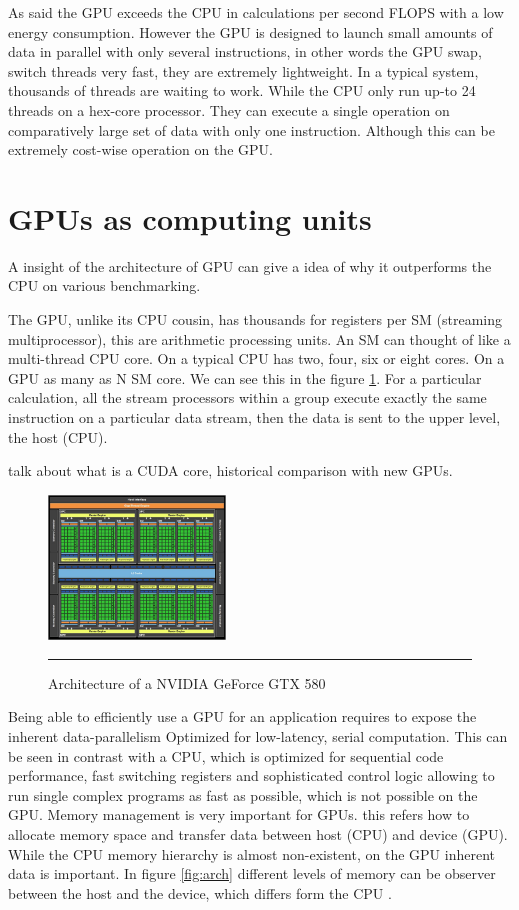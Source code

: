 As said the GPU exceeds the CPU in calculations per second FLOPS with a low energy consumption. However the GPU is designed to launch small amounts of data in parallel with only several instructions, in other words the GPU swap, switch threads very fast, they are extremely lightweight. In a typical system, thousands of threads are waiting to work. While the CPU only run up-to 24 threads on a hex-core processor. They can execute a single operation on comparatively large set of data with only one instruction. Although this can be extremely cost-wise operation on the GPU.

\section{GPUs as computing units}

A insight of the architecture of GPU can give a idea of  why it outperforms the CPU on various benchmarking.

The GPU, unlike its CPU cousin, has thousands for registers per SM (streaming multiprocessor), this are  arithmetic processing units. An SM can thought of like a multi-thread CPU core. On a typical CPU has two, four, six or eight cores. On a GPU as many as N SM core. We can see this in the figure \ref{fig:gpu_cpu}. For a particular calculation, all the stream
processors within a group execute exactly the same instruction on a particular data stream, then the data is sent to the upper level, the host (CPU). \cite{cook}

talk about what is a CUDA core, historical comparison with new GPUs.

\begin{figure}[htbp]
	\centering
		\includegraphics[width=0.42\textwidth]{Figures/GPU_CPU.png}
		\rule{35em}{0.5pt}
	\caption[Architecture of a GPU]{Architecture of a NVIDIA GeForce GTX 580}
	\label{fig:gpu_cpu}
\end{figure}

Being able to efficiently use a GPU for an application requires to expose the inherent data-parallelism Optimized for low-latency, serial computation. This can be seen in contrast with a CPU, which is optimized for sequential code performance, fast switching registers  and sophisticated control logic allowing to run single complex programs as fast as possible, which is not possible on the GPU. Memory management is very important for GPUs. this refers how to allocate memory space and transfer data between host (CPU) and device (GPU). While the CPU memory hierarchy is almost non-existent, on the GPU inherent data is important. In figure \ref{fig:arch} different levels of memory can be observer between the host and the device, which differs form the CPU \cite{hwu}.

